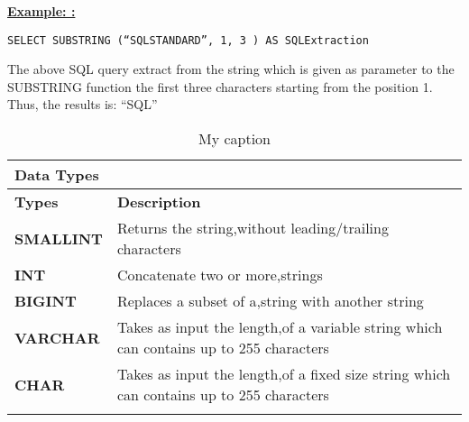 \noindent\textbf{\underline{Example: :} }
\begin{mdframed}[backgroundcolor=gray!20][h]
\begin{lstlisting}
SELECT SUBSTRING (“SQLSTANDARD”, 1, 3 ) AS SQLExtraction  
\end{lstlisting}
\end{mdframed}

The above SQL query extract from the string which is given as parameter to the SUBSTRING function the first three characters starting from the position 1. Thus, the results is: “SQL”

\begin{table}[h]
\centering
\caption{My caption}
\label{my-label}
\begin{tabular}{ll}
\hline
\multicolumn{2}{|l|}{\textbf{Data Types}}                                                                                                                                      \\ \hline
\multicolumn{1}{|l|}{\textbf{Types}}                           & \multicolumn{1}{l|}{\textbf{Description}}                                                                     \\ \hline
\multicolumn{1}{|l|}{{\color[HTML]{333333} \textbf{SMALLINT}}} & \multicolumn{1}{l|}{{\color[HTML]{333333} Returns the string,without leading/trailing characters}}            \\ \hline
\multicolumn{1}{|l|}{{\color[HTML]{333333} \textbf{INT}}}      & \multicolumn{1}{l|}{{\color[HTML]{333333} Concatenate two or more,strings}}                                   \\ \hline
\multicolumn{1}{|l|}{{\color[HTML]{333333} \textbf{BIGINT}}}   & \multicolumn{1}{l|}{{\color[HTML]{333333} Replaces a subset of a,string with another string}}                 \\ \hline
\multicolumn{1}{|l|}{\textbf{VARCHAR}}                         & \multicolumn{1}{l|}{Takes as input the length,of a variable string which can contains up to 255 characters}   \\ \hline
\multicolumn{1}{|l|}{\textbf{CHAR}}                            & \multicolumn{1}{l|}{Takes as input the length,of a fixed size string which can contains up to 255 characters} \\ \hline
                                                               &                                                                                                              
\end{tabular}
\end{table}

